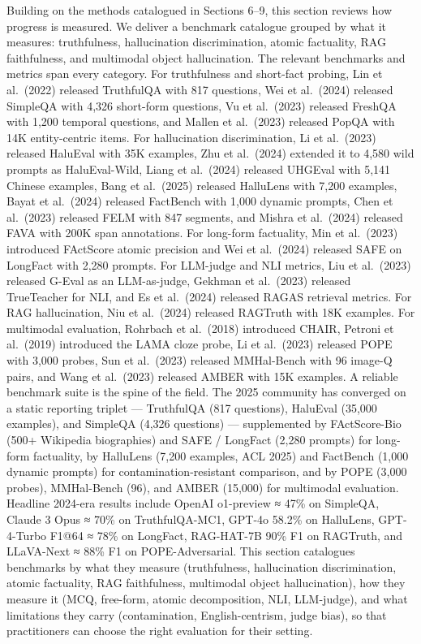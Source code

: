 Building on the methods catalogued in Sections 6--9, this section reviews how progress is measured. We deliver a benchmark catalogue grouped by what it measures: truthfulness, hallucination discrimination, atomic factuality, RAG faithfulness, and multimodal object hallucination. The relevant benchmarks and metrics span every category. For truthfulness and short-fact probing, Lin et al.~(2022) released TruthfulQA with 817 questions, Wei et al.~(2024) released SimpleQA with 4,326 short-form questions, Vu et al.~(2023) released FreshQA with 1,200 temporal questions, and Mallen et al.~(2023) released PopQA with 14K entity-centric items. For hallucination discrimination, Li et al.~(2023) released HaluEval with 35K examples, Zhu et al.~(2024) extended it to 4,580 wild prompts as HaluEval-Wild, Liang et al.~(2024) released UHGEval with 5,141 Chinese examples, Bang et al.~(2025) released HalluLens with 7,200 examples, Bayat et al.~(2024) released FactBench with 1,000 dynamic prompts, Chen et al.~(2023) released FELM with 847 segments, and Mishra et al.~(2024) released FAVA with 200K span annotations. For long-form factuality, Min et al.~(2023) introduced FActScore atomic precision and Wei et al.~(2024) released SAFE on LongFact with 2,280 prompts. For LLM-judge and NLI metrics, Liu et al.~(2023) released G-Eval as an LLM-as-judge, Gekhman et al.~(2023) released TrueTeacher for NLI, and Es et al.~(2024) released RAGAS retrieval metrics. For RAG hallucination, Niu et al.~(2024) released RAGTruth with 18K examples. For multimodal evaluation, Rohrbach et al.~(2018) introduced CHAIR, Petroni et al.~(2019) introduced the LAMA cloze probe, Li et al.~(2023) released POPE with 3,000 probes, Sun et al.~(2023) released MMHal-Bench with 96 image-Q pairs, and Wang et al.~(2023) released AMBER with 15K examples. A reliable benchmark suite is the spine of the field. The 2025 community has converged on a static reporting triplet --- TruthfulQA (817 questions), HaluEval (35,000 examples), and SimpleQA (4,326 questions) --- supplemented by FActScore-Bio (500+ Wikipedia biographies) and SAFE / LongFact (2,280 prompts) for long-form factuality, by HalluLens (7,200 examples, ACL 2025) and FactBench (1,000 dynamic prompts) for contamination-resistant comparison, and by POPE (3,000 probes), MMHal-Bench (96), and AMBER (15,000) for multimodal evaluation. Headline 2024-era results include OpenAI o1-preview ≈ 47\% on SimpleQA, Claude 3 Opus ≈ 70\% on TruthfulQA-MC1, GPT-4o 58.2\% on HalluLens, GPT-4-Turbo F1@64 ≈ 78\% on LongFact, RAG-HAT-7B 90\% F1 on RAGTruth, and LLaVA-Next ≈ 88\% F1 on POPE-Adversarial. This section catalogues benchmarks by what they measure (truthfulness, hallucination discrimination, atomic factuality, RAG faithfulness, multimodal object hallucination), how they measure it (MCQ, free-form, atomic decomposition, NLI, LLM-judge), and what limitations they carry (contamination, English-centrism, judge bias), so that practitioners can choose the right evaluation for their setting.

